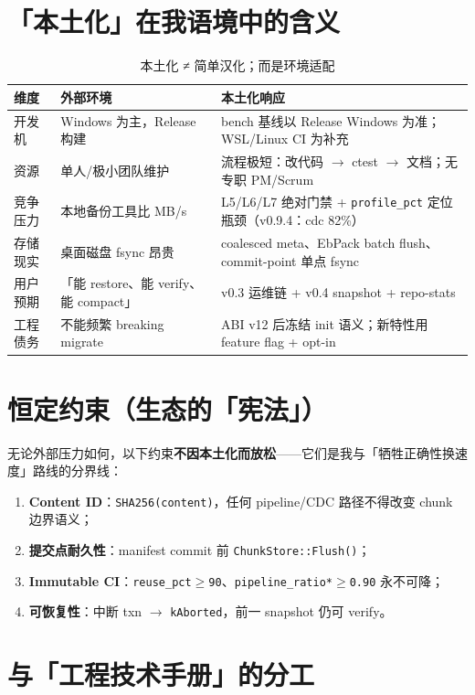 \section{「本土化」在我语境中的含义}

\begin{table}[htbp]
\centering
\caption{本土化 ≠ 简单汉化；而是环境适配}
\begin{tabular}{@{}llp{7cm}@{}}
\toprule
维度 & 外部环境 & 本土化响应 \\
\midrule
开发机 & Windows 为主，Release 构建 & bench 基线以 Release Windows 为准；WSL/Linux CI 为补充 \\
资源 & 单人/极小团队维护 & 流程极短：改代码 $\rightarrow$ ctest $\rightarrow$ 文档；无专职 PM/Scrum \\
竞争压力 & 本地备份工具比 MB/s & L5/L6/L7 绝对门禁 + \texttt{profile\_pct} 定位瓶颈（v0.9.4：cdc 82\%） \\
存储现实 & 桌面磁盘 fsync 昂贵 & coalesced meta、EbPack batch flush、commit-point 单点 fsync \\
用户预期 & 「能 restore、能 verify、能 compact」 & v0.3 运维链 + v0.4 snapshot + repo-stats \\
工程债务 & 不能频繁 breaking migrate & ABI v12 后冻结 init 语义；新特性用 feature flag + opt-in \\
\bottomrule
\end{tabular}
\end{table}

\section{恒定约束（生态的「宪法」）}

无论外部压力如何，以下约束\textbf{不因本土化而放松}——它们是我与「牺牲正确性换速度」路线的分界线：

\begin{enumerate}
  \item \textbf{Content ID}：\texttt{SHA256(content)}，任何 pipeline/CDC 路径不得改变 chunk 边界语义；
  \item \textbf{提交点耐久性}：manifest commit 前 \texttt{ChunkStore::Flush()}；
  \item \textbf{Immutable CI}：\texttt{reuse\_pct$\geq$90}、\texttt{pipeline\_ratio*$\geq$0.90} 永不可降；
  \item \textbf{可恢复性}：中断 txn $\rightarrow$ \texttt{kAborted}，前一 snapshot 仍可 verify。
\end{enumerate}

\section{与「工程技术手册」的分工}

